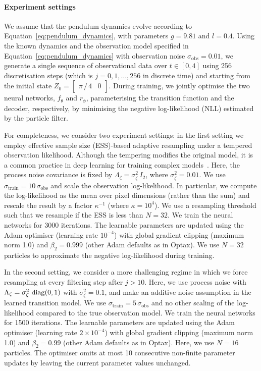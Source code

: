 \documentclass{article}
\begin{document}
\paragraph{Experiment settings}
We assume that the pendulum dynamics evolve according to Equation~\eqref{eq:pendulum_dynamics}, with parameters $g=9.81$ and $l=0.4$. 
Using the known dynamics and the observation model specified in Equation~\eqref{eq:pendulum_dynamics} with observation noise $\sigma_{\mathrm{obs}} = 0.01$, we generate a single sequence of observational data over $t \in [0,4]$ using 256 discretisation steps (which is $j=0,1,\ldots, 256$ in discrete time) and starting from the initial state $Z_0 = \begin{bmatrix} \pi \, / \, 4 & 0 \end{bmatrix}$. 
During training, we jointly optimise the two neural networks, $f_\theta$ and $r_\phi$, parameterising the transition function and the decoder, respectively, by minimising the negative log-likelihood (NLL) estimated by the particle filter.  

For completeness, we consider two experiment settings: in the first setting we employ effective sample size (ESS)-based adaptive resampling under a tempered observation likelihood. 
Although the tempering modifies the original model, it is a common practice in deep learning for training complex models~\citep[see, e.g.,][]{Ng2025}. 
Here, the process noise covariance is fixed by $\Lambda_{\zeta} = \sigma_{\zeta}^2 \, I_2 $, where $\sigma_{\zeta}^2=0.01$. We use $\sigma_{\mathrm{train}} = 10 \, \sigma_{\mathrm{obs}}$ and scale the observation log-likelihood. In particular, we compute the log-likelihood as the mean over pixel dimensions (rather than the sum) and rescale the result by a factor $\kappa^{-1}$ (where $\kappa = 10^4$). 
We use a resampling threshold such that we resample if the ESS is less than $N=32$. We train the neural networks for 3000 iterations. The learnable parameters are updated using the Adam optimiser (learning rate $10^{-4}$) with global gradient clipping (maximum norm 1.0) and $\beta_2=0.999$ (other Adam defaults as in Optax). We use $N = 32$ particles to approximate the negative log-likelihood during training.

In the second setting, we consider a more challenging regime in which we force resampling at every filtering step after $j > 10$. Here, we use process noise with $\Lambda_{\zeta} = \sigma_{\zeta}^2 \, \diag{0,1}$ with $\sigma_{\zeta}^2=0.1$, and make an additive noise assumption in the learned transition model. We use $\sigma_{\mathrm{train}} = 5 \, \sigma_{\mathrm{obs}}$ and no other scaling of the log-likelihood compared to the true observation model. We train the neural networks for 1500 iterations. The learnable parameters are updated using the Adam optimiser (learning rate $2\times 10^{-4}$) with global gradient clipping (maximum norm 1.0) and $\beta_2=0.99$ (other Adam defaults as in Optax). Here, we use $N=16$ particles. The optimiser omits at most 10 consecutive non-finite parameter updates by leaving the current parameter values unchanged.
\end{document}
